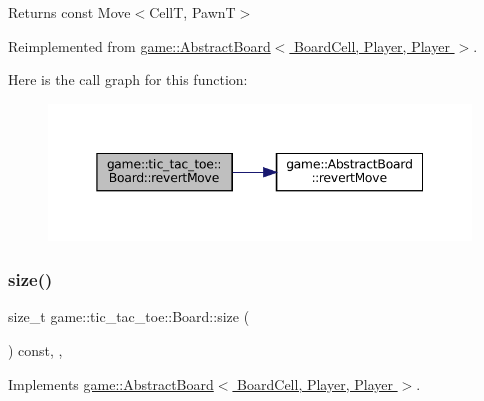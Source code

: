 \begin{DoxyReturn}{Returns}
const Move$<$\+Cell\+T, Pawn\+T$>$ 
\end{DoxyReturn}


Reimplemented from \hyperlink{classgame_1_1_abstract_board_acc2d5fac68ec019e42fe166b727b7299}{game\+::\+Abstract\+Board$<$ Board\+Cell, Player, Player $>$}.

Here is the call graph for this function\+:
\nopagebreak
\begin{figure}[H]
\begin{center}
\leavevmode
\includegraphics[width=345pt]{classgame_1_1tic__tac__toe_1_1_board_ac77aad0bb0945d12a959bb8db0e31908_cgraph}
\end{center}
\end{figure}
\mbox{\label{classgame_1_1tic__tac__toe_1_1_board_ac9d2d5da2263bb6166f93eec382380db}} 
\subsubsection{\texorpdfstring{size()}{size()}}
{\footnotesize\ttfamily size\+\_\+t game\+::tic\+\_\+tac\+\_\+toe\+::\+Board\+::size (\begin{DoxyParamCaption}{ }\end{DoxyParamCaption}) const\hspace{0.3cm}{\ttfamily [inline]}, {\ttfamily [override]}, {\ttfamily [virtual]}}



Implements \hyperlink{classgame_1_1_abstract_board_a17bd6905ded76d0005437d288fe8ac21}{game\+::\+Abstract\+Board$<$ Board\+Cell, Player, Player $>$}.

